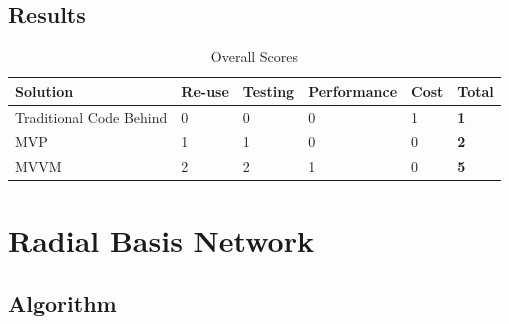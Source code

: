 \documentclass[ece]{uw-wkrpt}
\begin{document}
\subsection{Results}
\begin{table}
\begin{center}
    \begin{tabular}{ | l | l | l | l | l | l |}
    \hline
    Solution & Re-use &Testing & Performance & Cost & Total  \\ \hline
    Traditional Code Behind & 0 & 0 & 0 & 1 &  \textbf 1  \\ \hline
    MVP & 1 & 1 & 0 & 0 &  \textbf 2  \\ \hline
    MVVM & 2 & 2 & 1 & 0 &  \textbf 5  \\ \hline
    \hline
    \end{tabular}
\end{center}
\caption{ Overall Scores}
	\label{table:overall}
\end{table}

\section {Radial Basis Network}
\subsection{ Algorithm}
\end{document}
